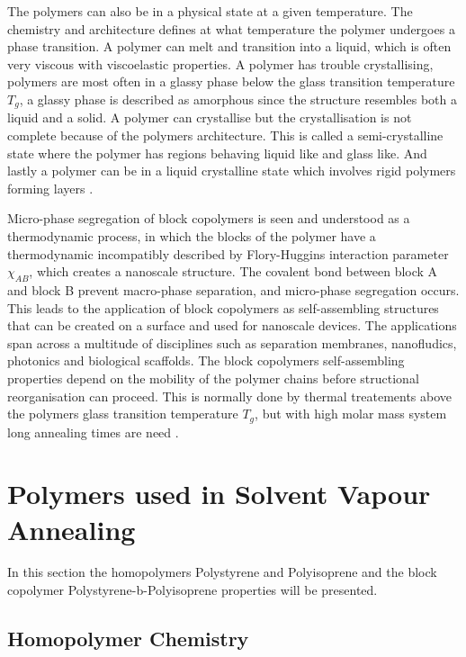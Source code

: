 \documentclass[MasterThesisMain.tex]{subfiles}
\begin{document}
The polymers can also be in a physical state at a given temperature. The chemistry and architecture defines at what temperature the polymer undergoes a phase transition. A polymer can melt and transition into a liquid, which is often very viscous with viscoelastic properties. A polymer has trouble crystallising, polymers are most often in a glassy phase below the glass transition temperature $T_g$, a glassy phase is described as amorphous since the structure resembles both a liquid and a solid. A polymer can crystallise but the crystallisation is not complete because of the polymers architecture. This is called a semi-crystalline state where the polymer has regions behaving liquid like and glass like. And lastly a polymer can be in a liquid crystalline state which involves rigid polymers forming layers \cite{petty2008molecular}. 

Micro-phase segregation of block copolymers is seen and understood as a thermodynamic process, in which the blocks of the polymer have a thermodynamic incompatibly described by Flory-Huggins interaction parameter $\chi_{AB}$, which creates a nanoscale structure. The covalent bond between block A and block B prevent macro-phase separation, and micro-phase segregation occurs.  This leads to the application of block copolymers as self-assembling structures that can be created on a surface and used for nanoscale devices. The applications span across a multitude of disciplines such as separation membranes, nanofludics, photonics and biological scaffolds. The block copolymers self-assembling properties depend on the mobility of the polymer chains before structional reorganisation can proceed. This is normally done by thermal treatements above the polymers glass transition temperature $T_g$, but with high molar mass system long annealing times are need \cite{SVABCP}.

\section{Polymers used in Solvent Vapour Annealing}
In this section the homopolymers Polystyrene and Polyisoprene and the block copolymer Polystyrene-b-Polyisoprene properties will be presented.  

\subsection{Homopolymer Chemistry}
\newcommand\setpolymerdelim[2]{\def\delimleft{#1}\def\delimright{#2}}
\def\makebraces[#1,#2]#3#4#5{%
\edef\delimhalfdim{\the\dimexpr(#1+#2)/2}%
\edef\delimvshift{\the\dimexpr(#1-#2)/2}%
\chemmove{%
\node[at=(#4),yshift=(\delimvshift)]
{$\left\delimleft\vrule height\delimhalfdim depth\delimhalfdim
width0pt\right.$};%
\node[at=(#5),yshift=(\delimvshift)]
{$\left.\vrule height\delimhalfdim depth\delimhalfdim
width0pt\right\delimright_{\rlap{$\scriptstyle#3$}}$};}}
\end{document}
